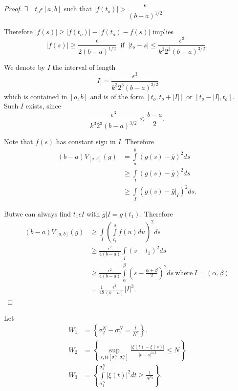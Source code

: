 \begin{proof}
  $\exists \quad t_o \epsilon  [a, b]$  such that $| f (t_o) | >
  \dfrac{\epsilon }{(b - a)^{1/2}}$. 
 
  Therefore $| f (s) | \geq | f (t_o)| - |f (t_o) - f (s) | $ implies 
  $$
  | f (s) | \geq \frac{\epsilon }{2(b - a)^{1/2}} ~\text{ if }~ | t_o -
  s | \leq \frac{\epsilon ^3}{k^3 2^3 (b - a)^{3/2}}. 
  $$

  We denote by $I$ the interval of length
  $$
  | I | = \frac{\epsilon ^3}{k^3 2^3 (b - a)^{3/2}}
  $$
  which is contained in $[a, b]$  and is of the form $[t_o, t_o + |I|]$
  or $[t_o -|I|, t_o]$. Such  $I$ exists, since 
  $$
  \frac{\epsilon ^3}{k^3 2^3 (b-a)^{3/2}} \leq \frac{b-a}{2}.
  $$
  
  Note that $f (s)$ has constant sign in $I$. Therefore
  \begin{align*}
    (b-a) V_{[a, b]}(g) &=\int\limits_{a}^{b} (g(s) - \bar{g})^2 ds \\
    & \geq \int\limits_I (g(s) - \bar{g})^2  ds \\
    & \geq \int\limits _I (g (s) - \bar{g}|_I )^2 ds.
  \end{align*}
  
  But\pageoriginale we can always find $t_1 \epsilon  I$ with $\bar{g}| I = g
  (t_1)$. Therefore
  \begin{align*}
    (b - a) V_{[a, b]} (g) &\geq \int\limits _I \left(
    \int\limits_{t_{1}}^{s} f(u) du\right)^2 ds \\ 
    &\geq \frac{ \epsilon ^2}{4(b-a)} \int\limits_I (s - t_1)^2 ds \\
    &\geq \frac{\epsilon  ^2}{4(b-a)} \int\limits_{\alpha}^{\beta} 
    \left(s- \frac{\alpha+\beta}{2}\right)^2 ds~ \text{where}~ I =
    (\alpha, \beta )\\ 
    &= \frac{1}{48} \frac{\epsilon^2}{(b-a)}|I|^3.
  \end{align*}
\end{proof}


\medskip
{}
  Let
  \begin{align*}
    W_1&= \left\{ \sigma ^N _2 - \sigma^ N _1 =
    \frac{\bar{t}}{N^3}\right\}.\\ 
    W_2 &= \left\{ \sup_{s, t \epsilon  [ \sigma_1^N, \sigma_2^N ]}
    \frac{| \xi (t) - \xi (s)|}{| t - s| ^{1/3}}\leq N \right\}\\ 
    W_3 &= \left\{ \int\limits_{\sigma_1^N}^{ \sigma_2 ^N}  | \xi (t) |^2
    dt \geq \frac{1}{N^{c_{4}}}\right\}. 
  \end{align*}


